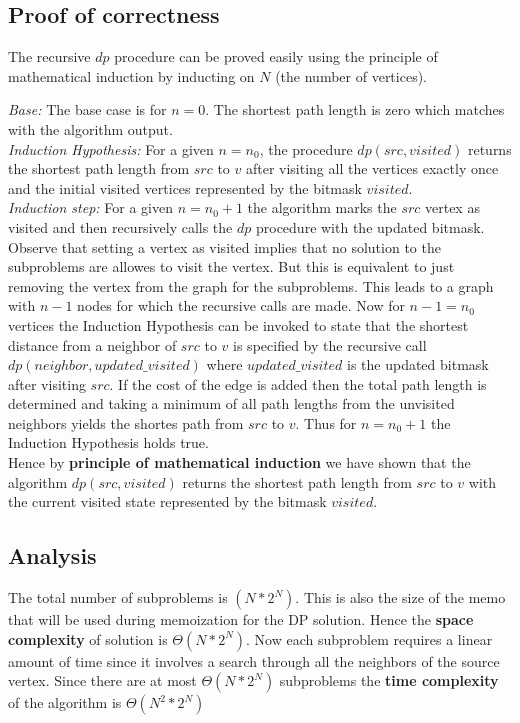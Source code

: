\documentclass{article}
\begin{document}
\subsection{Proof of correctness}
The recursive $dp$ procedure can be proved easily using the principle of mathematical induction by inducting on $N$ (the number of vertices).

\textit{Base:}  The base case is for $n = 0$. The shortest path length is zero which matches with the algorithm output.\\

\textit{Induction Hypothesis: } For a given $n = n_0$, the procedure $dp(src, visited)$ returns the shortest path length from $src$ to $v$ after visiting all the vertices
exactly once and the initial visited vertices represented by the bitmask $visited$.\\

\textit{Induction step:} For a given $n = n_0 + 1$ the algorithm marks the $src$ vertex as visited and then recursively calls the $dp$ procedure
with the updated bitmask. Observe that setting a vertex as visited implies that no solution to the subproblems are allowes to visit the vertex.
But this is equivalent to just removing the vertex from the graph for the subproblems. This leads to a graph with $n - 1$ nodes for which the recursive calls 
are made. Now for $n - 1 = n_0$ vertices the Induction Hypothesis can be invoked to state that the shortest distance from a neighbor of $src$ to $v$ is specified
by the recursive call $dp(neighbor, updated\_visited)$ where $updated\_visited$ is the updated bitmask after visiting $src$. If the cost of the edge is added
then the total path length is determined and taking a minimum of all path lengths from the unvisited neighbors yields the shortes path from $src$ to $v$.
Thus for $n = n_0 + 1$ the Induction Hypothesis holds true.\\


Hence by \textbf{principle of mathematical induction} we have shown that the algorithm $dp(src, visited)$ returns the shortest path length from $src$ to $v$ with the current visited
state represented by the bitmask $visited$.

\subsection{Analysis}

The total number of subproblems is $(N*2^N)$. This is also the size of the memo that will be used during memoization for the DP solution.
Hence the \textbf{space complexity} of solution is $\Theta(N*2^N)$. Now each subproblem requires a linear amount of time since it involves a 
search through all the neighbors of the source vertex. Since there are at most $\Theta(N*2^N)$ subproblems the \textbf{time complexity} of the 
algorithm is $\Theta(N^2*2^N)$
\end{document}
